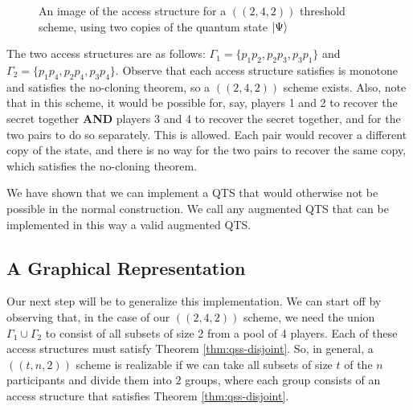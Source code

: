 \begin{figure}[H]
	\begin{center}
	\end{center}
	\caption{An image of the access structure for a $((2,4,2))$ threshold scheme, using two copies of the quantum state $\ket{\Psi}$}
	\label{fig:2-4-2}
\end{figure}

The two access structures are as follows: $\Gamma_1 = \{p_1p_2,p_2p_3,p_3p_1\}$ and $\Gamma_2 = \{p_1p_4,p_2p_4,p_3p_4\}$. Observe that each access structure satisfies is monotone and satisfies the no-cloning theorem, so a $((2,4,2))$ scheme exists. Also, note that in this scheme, it would be possible for, say, players 1 and 2 to recover the secret together \textbf{AND} players 3 and 4 to recover the secret together, and for the two pairs to do so separately. This is allowed. Each pair would recover a different copy of the state, and there is no way for the two pairs to recover the same copy, which satisfies the no-cloning theorem.

We have shown that we can implement a QTS that would otherwise not be possible in the normal construction. We call any augmented QTS that can be implemented in this way a valid augmented QTS.

\subsection{A Graphical Representation}
\label{ssec:graphical-rep}

Our next step will be to generalize this implementation. We can start off by observing that, in the case of our $((2,4,2))$ scheme, we need the union $\Gamma_1 \cup \Gamma_2$ to consist of all subsets of size 2 from a pool of 4 players. Each of these access structures must satisfy Theorem \ref{thm:qss-disjoint}. So, in general, a $((t,n,2))$ scheme is realizable if we can take all subsets of size $t$ of the $n$ participants and divide them into $2$ groups, where each group consists of an access structure that satisfies Theorem \ref{thm:qss-disjoint}. 

